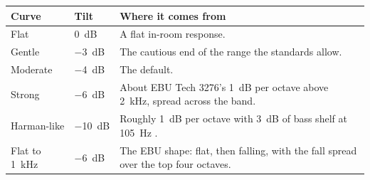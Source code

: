\begin{center}
\renewcommand{\arraystretch}{1.3}
\begin{tabularx}{\textwidth}{l l X}
\toprule
\textbf{Curve} & \textbf{Tilt} & \textbf{Where it comes from} \\
\midrule
Flat                 & \SI{0}{\dB}   & A flat in-room response. \\
Gentle               & \SI{-3}{\dB}  & The cautious end of the range the standards allow. \\
Moderate             & \SI{-4}{\dB}  & The default. \\
Strong               & \SI{-6}{\dB}  & About EBU Tech 3276's \SI{1}{\dB} per octave above \SI{2}{\kilo\hertz}, spread across the band. \\
Harman-like          & \SI{-10}{\dB} & Roughly \SI{1}{\dB} per octave with \SI{+3}{\dB} of bass shelf at \SI{105}{\hertz} \cite{Olive2013}. \\
Flat to \SI{1}{\kilo\hertz} & \SI{-6}{\dB} & The EBU shape: flat, then falling, with the fall spread over the top four octaves. \\
\bottomrule
\end{tabularx}
\end{center}



